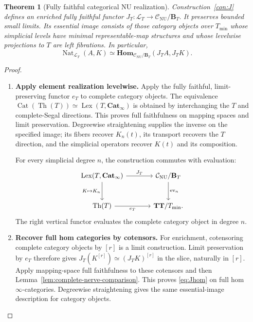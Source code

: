 \documentclass[oneside]{article}
\theoremstyle{plain}
\newtheorem{theorem}{Theorem}[section]
\theoremstyle{definition}
\theoremstyle{remark}
\newcommand{\B}{\mathbf B}
\newcommand{\CNU}{\mathcal C_{\mathrm{NU}}}
\newcommand{\Cat}{\mathbf{Cat}_{\infty}}
\newcommand{\Homc}{\mathbf{Hom}}
\newcommand{\J}{J}
\newcommand{\LT}{\mathcal L_T}
\newcommand{\Lex}{\operatorname{Lex}}
\newcommand{\Nat}{\operatorname{Nat}}
\newcommand{\TT}{\mathbf{TT}}
\newcommand{\Th}{\operatorname{Th}}
\newcommand{\eT}{e_T}
\newcommand{\minrep}{\mathrm{min}}
\begin{document}
\begin{theorem}[Fully faithful categorical NU realization]\label{thm:J}
Construction~\ref{con:J} defines an enriched fully faithful functor $\J_T:\LT\longrightarrow\CNU/\B_T.$ It preserves bounded small limits. Its essential image consists of those category objects over $T_{\minrep}$ whose simplicial levels have minimal representable-map structures and whose levelwise projections to $T$ are left fibrations. In particular,
\begin{equation}\label{eq:Jhom}
 \Nat_{\LT}(A,K)\simeq
 \Homc_{\CNU/\B_T}(\J_TA,\J_TK).
\end{equation}
\end{theorem}
\begin{proof}
\leavevmode
\begin{enumerate}
\item \textbf{Apply element realization levelwise.} Apply the fully faithful, limit-preserving functor $\eT$ to complete category objects. The equivalence $\operatorname{Cat}(\Th(T))\simeq\Lex(T,\Cat)$ is obtained by interchanging the $T$ and complete-Segal directions. This proves full faithfulness on mapping spaces and limit preservation. Degreewise straightening supplies the inverse on the specified image; its fibers recover $K_n(t)$, its transport recovers the $T$ direction, and the simplicial operators recover $K(t)$ and its composition.
\begin{samepage}
For every simplicial degree $n$, the construction commutes with evaluation:
\[
\begin{tikzcd}[column sep=large,row sep=large]
 \Lex(T,\Cat)\ar[r,"\J_T"]\ar[d,"K\mapsto K_n"']&
 \CNU/\B_T\ar[d,"\operatorname{ev}_n"]\\
 \Th(T)\ar[r,"\eT"']&\TT/T_{\minrep}.
\end{tikzcd}
\]
The right vertical functor evaluates the complete category object in
degree $n$.
\end{samepage}
\item \textbf{Recover full hom categories by cotensors.} For enrichment, cotensoring complete category objects by $[r]$ is a
limit construction. Limit preservation by $\eT$ therefore gives
$\J_T(K^{[r]})\simeq(\J_TK)^{[r]}$ in the slice, naturally in $[r]$.
Apply mapping-space full faithfulness to these cotensors and then
Lemma~\ref{lem:complete-nerve-comparison}. This proves
\eqref{eq:Jhom} on full hom $\infty$-categories. Degreewise straightening
gives the same essential-image description for category objects.\qedhere
\end{enumerate}
\end{proof}
\end{document}
